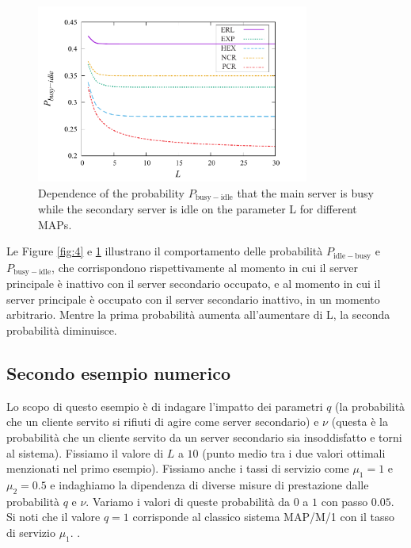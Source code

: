 \documentclass[11pt]{article}
\begin{document}
\begin{figure}
    \centering
    \includegraphics[width=0.8\textwidth]{EZp90oP.png}
    \caption{Dependence of the probability $P_{\mathrm{busy-idle}}$ that the main server is busy while the secondary server is idle on the parameter L for different MAPs.}
    \label{fig:5}
\end{figure}

Le Figure \ref{fig:4} e \ref{fig:5} illustrano il comportamento delle probabilità $P_{\mathrm{idle-busy}}$ e  $P_{\mathrm{busy-idle}}$, che corrispondono rispettivamente al momento in cui il server principale è inattivo con il server secondario occupato, e al momento in cui il server principale è occupato con il server secondario inattivo, in un momento arbitrario. Mentre la prima probabilità aumenta all'aumentare di L, la seconda probabilità diminuisce.

\clearpage

\subsection{Secondo esempio numerico}
Lo scopo di questo esempio è di indagare l'impatto dei parametri $q$ (la probabilità che un cliente servito si rifiuti di agire come server secondario) e $\nu$ (questa è la probabilità che un cliente servito da un server secondario sia insoddisfatto e torni al sistema). Fissiamo il valore di $L$ a $10$ (punto medio tra i due valori ottimali menzionati nel primo esempio). Fissiamo anche i tassi di servizio come $\mu_1 = 1$ e $\mu_2 = 0.5$ e indaghiamo la dipendenza di diverse misure di prestazione dalle probabilità $q$ e $\nu$. Variamo i valori di queste probabilità da $0$ a $1$ con passo $0.05$. Si noti che il valore $q = 1$ corrisponde al classico sistema MAP/M/1 con il tasso di servizio $\mu_1$. \vspace{0.4cm}.
\end{document}
